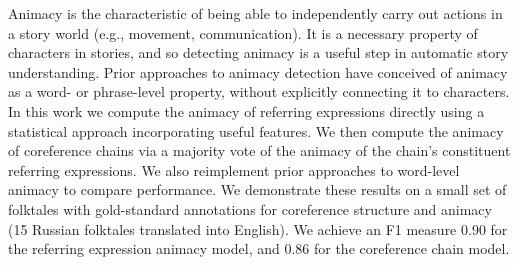 Animacy is the characteristic of being able to independently carry out actions in a story world (e.g., movement, communication). It is a necessary property of characters in stories, and so detecting animacy is a useful step in automatic story understanding. Prior approaches to animacy detection have conceived of animacy as a word- or phrase-level property, without explicitly connecting it to characters. In this work we compute the animacy of referring expressions directly using a statistical approach incorporating useful features. We then compute the animacy of coreference chains via a majority vote of the animacy of the chain's constituent referring expressions. We also reimplement prior approaches to word-level animacy to compare performance. We demonstrate these results on a small set of folktales with gold-standard annotations for coreference structure and animacy (15 Russian folktales translated into English). We achieve an F1 measure 0.90 for the referring expression animacy model, and 0.86 for the coreference chain model.
